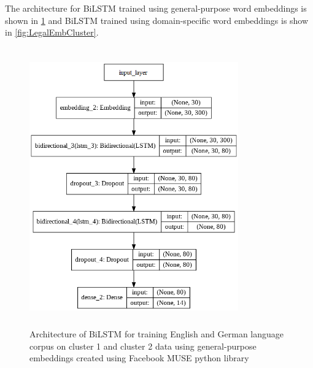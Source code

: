 The architecture for \gls{BiLSTM} trained using general-purpose word embeddings is shown in \ref{fig:FBMuseCluster} and \gls{BiLSTM} trained using domain-specific word embeddings is show in \ref{fig:LegalEmbCluster}.

\begin{figure}[!ht]
    \centering
    \includegraphics[width=9cm, height=12cm]{pics/FBMUSE_Untrained_cluster_1.png}
    \captionsetup{justification=centering,margin=2cm}
    \caption{Architecture of \gls{BiLSTM} for training English and German language corpus on cluster 1 and cluster 2 data using general-purpose embeddings created using Facebook MUSE python library}
    \label{fig:FBMuseCluster}
\end{figure}



